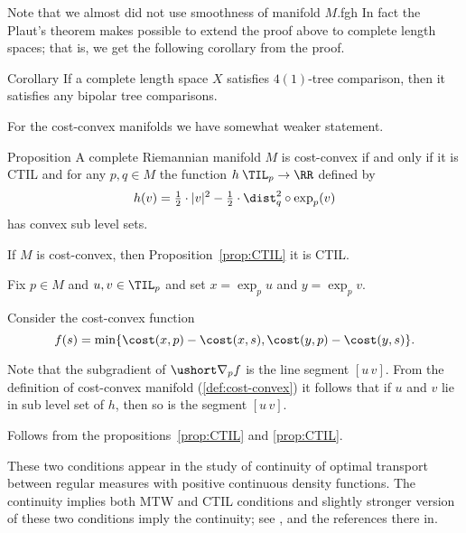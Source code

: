














Note that we almost did not use smoothness of manifold $M$.fgh
In fact the Plaut's theorem makes possible to extend the proof above to complete length spaces;
that is, we get the following corollary from the proof.

\begin{thm}{Corollary}\label{cor:4(1)=>n(1)}
If a complete length space $X$ satisfies $4(1)$-tree comparison, then it satisfies any bipolar tree comparisons.
\end{thm}

For the cost-convex manifolds we have somewhat weaker statement.

\begin{thm}{Proposition}\label{prop:convexity-MTW}
A complete Riemannian manifold $M$ is cost-convex if and only if it is CTIL and
for any $p,q\in M$ the function $h\: \TIL_p\to \RR$ defined by
\[h(v)=\tfrac12\cdot|v|^2-\tfrac12\cdot\dist_q^2\circ\exp_p(v)\] 
has convex sub level sets.
\end{thm}

If $M$ is cost-convex, then Proposition~\ref{prop:CTIL} it is CTIL.

Fix $p\in M$ and $u,v\in \TIL_p$
and set $x=\exp_pu$ and $y=\exp_pv$.

Consider the cost-convex function 
\[f(s)=\min\{\cost(x,p)-\cost(x,s),\cost(y,p)-\cost(y,s)\}.\]

Note that the subgradient of $\ushort\nabla_pf$ is the line segment $[u\,v]$.
From the definition of cost-convex manifold (\ref{def:cost-convex}) it follows that if $u$ and $v$ lie in sub level set of $h$, then so is the segment $[u\,v]$.

 Follows from the propositions~\ref{prop:CTIL} and \ref{prop:CTIL}.
\qeds











These two conditions appear in the study of continuity of optimal transport between regular measures with positive continuous density functions.
The continuity implies both MTW and CTIL conditions and slightly stronger version of these two conditions imply the continuity;
see \cite{FRV-Nec+Suf}, \cite{MTW+CTIL} and the references there in.

